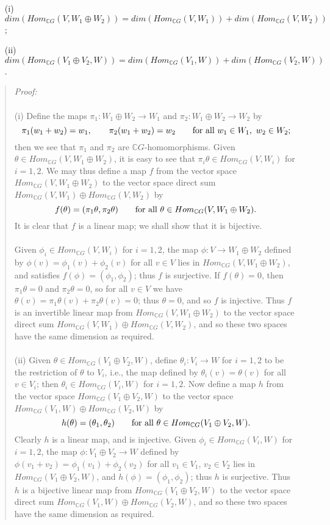 \begin{itemize}
\item[(i)] $dim(Hom_{{\mathbb C}G}(V,W_1\oplus W_2))
=dim(Hom_{{\mathbb C}G}(V,W_1))+dim(Hom_{{\mathbb C}G}(V,W_2))$;
\item[(ii)] $dim(Hom_{{\mathbb C}G}(V_1\oplus V_2,W))
=dim(Hom_{{\mathbb C}G}(V_1,W))+dim(Hom_{{\mathbb C}G}(V_2,W))$.
\end{itemize}
\begin{quote}
\emph{Proof:}
\\
\\
(i) Define the maps $\pi_1:W_1\oplus W_2\rightarrow W_1$ and
$\pi_2:W_1\oplus W_2\rightarrow W_2$ by
$$\pi_1(w_1+w_2)=w_1,\qquad\pi_2(w_1+w_2)=w_2\qquad\hbox{for all }w_1\in W_1,\
w_2\in W_2;$$
then we see that $\pi_1$ and $\pi_2$ are
${\mathbb C}G$-homomorphisms. Given
$\theta\in Hom_{{\mathbb C}G}(V,W_1\oplus W_2)$, it is easy to see that
$\pi_i\theta\in Hom_{{\mathbb C}G}(V,W_i)$ for $i=1,2$. We may
thus define a map $f$ from the vector space
$Hom_{{\mathbb C}G}(V,W_1\oplus W_2)$ to the vector space direct sum
$Hom_{{\mathbb C}G}(V,W_1)\oplus Hom_{{\mathbb C}G}(V,W_2)$ by
$$f(\theta)=(\pi_1\theta,\pi_2\theta)\qquad\hbox{for all }\theta\in
 Hom_{{\mathbb C}G}(V,W_1\oplus W_2).$$
It is clear that $f$ is a linear map; we shall show that it is bijective.
\\
\\
Given $\phi_i\in Hom_{{\mathbb C}G}(V,W_i)$ for $i=1,2$, the map
$\phi: V\rightarrow W_1\oplus W_2$ defined by
$\phi(v)=\phi_1(v)+\phi_2(v)$ for all $v\in V$ lies in
$Hom_{{\mathbb C}G}(V,W_1\oplus W_2)$, and satisfies
$f(\phi)=(\phi_1,\phi_2)$; thus $f$ is surjective. If $f(\theta)=0$, then
$\pi_1\theta=0$ and $\pi_2\theta=0$, so for all $v\in V$ we have
$\theta(v)=\pi_1\theta(v)+\pi_2\theta(v)=0$; thus $\theta=0$, and so
$f$ is injective. Thus $f$ is an invertible linear map from
$Hom_{{\mathbb C}G}(V,W_1\oplus W_2)$ to the vector space direct sum
$Hom_{{\mathbb C}G}(V,W_1)\oplus Hom_{{\mathbb C}G}(V,W_2)$, and so these two spaces have the same
dimension as required.
\\
\\
(ii) Given $\theta\in Hom_{{\mathbb C}G}(V_1\oplus V_2,W)$, define
$\theta_i: V_i \rightarrow W$ for $i=1,2$ to be the restriction of
$\theta$ to $V_i$, i.e., the map defined by $\theta_i(v)= \theta(v)$ for all
$v \in V_i$; then $\theta_i \in Hom_{{\mathbb C}G}(V_i,W)$ for $i=1,2$. Now define a
map $h$ from the vector space $Hom_{{\mathbb C}G}(V_1\oplus V_2,W)$ to the vector space
$Hom_{{\mathbb C}G}(V_1,W) \oplus Hom_{{\mathbb C}G}(V_2,W)$ by
$$h(\theta)=(\theta_1,\theta_2)\qquad\hbox{for all }\theta\in
Hom_{{\mathbb C}G}(V_1\oplus V_2,W).$$
Clearly $h$ is a linear map, and is injective. Given
$\phi_i\in Hom_{{\mathbb C}G}(V_i,W)$ for $i=1,2$, the map 
$\phi: V_1 \oplus V_2 \rightarrow W$ defined by
$\phi(v_1+v_2)= \phi_1(v_1)+\phi_2(v_2)$ for all
$v_1\in V_1$, $v_2\in V_2$ lies in $Hom_{{\mathbb C}G}(V_1\oplus V_2,W)$, and
$h(\phi)=(\phi_1,\phi_2)$; thus $h$ is surjective. Thus $h$ is a
bijective linear map from $Hom_{{\mathbb C}G}(V_1\oplus V_2,W)$ to the vector space
direct sum $Hom_{{\mathbb C}G}(V_1,W)\oplus Hom_{{\mathbb C}G}(V_2,W)$, and so these two spaces
have the same dimension as required.
\end{quote}
